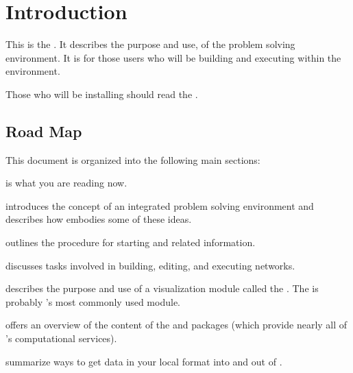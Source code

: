 %

\section{Introduction}
\label{sec:intro}


This is the \etitle{\srug}.  It describes the purpose and use, of the \sr{}
problem solving environment.  It is for those users who will be building
and executing  within the \sr{} environment.

Those who will be installing \sr{} should read the
\htmladdnormallinkfoot{\srig{}}{\installguideurl}.




\subsection{Road Map}
\label{sec:roadmap}

This document is organized into the following main sections:

\begin{description}
  \item {} is what you are reading now.
  \item {} introduces the concept of an
        integrated problem solving environment  and describes how \SR{}
        embodies some of these ideas.
  \item {}  outlines the procedure for
        starting \sr{} and related information.
  \item {} discusses tasks
        involved in building, editing, and executing networks.
  \item {} describes the
        purpose and use of a visualization module called the \viewer{}.  The
        \viewer{} is probably \sr{}'s most commonly used module.
  \item {} offers an overview of the content
        of the \sr{} and \pse{} packages (which provide nearly all of
        \sr{}'s computational services).
  \item {} summarize ways to
        get data in your local format into and out of \SR{}.
\end{description}

